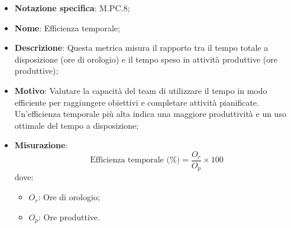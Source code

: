 \begin{itemize}
    \item \textbf{Notazione specifica}: M.PC.8;
    \item \textbf{Nome}: Efficienza temporale;
    \item \textbf{Descrizione}: Questa metrica misura il rapporto tra il tempo totale a disposizione (ore di orologio) e il tempo speso in attività produttive (ore produttive);
    \item \textbf{Motivo}: Valutare la capacità del team di utilizzare il tempo in modo efficiente per raggiungere obiettivi e completare attività pianificate. Un'efficienza temporale più alta indica una maggiore produttività e un uso ottimale del tempo a disposizione;
    \item \textbf{Misurazione}:
    \[
        \text{Efficienza temporale (\%)} = \frac{O_r}{O_p} \times 100
    \]
    dove:
    \begin{itemize}
        \item $O_{r}$: Ore di orologio;
        \item $O_{p}$: Ore produttive.
    \end{itemize}
\end{itemize}
